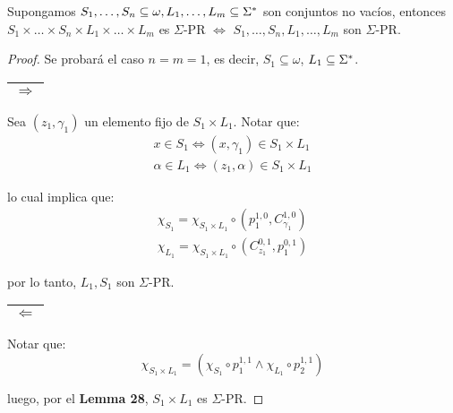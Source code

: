   \begin{lemma}
    \PN Supongamos $S_{1}, \dotsc, S_{n} \subseteq \omega, L_{1}, \dotsc, L_{m} \subseteq \Sigma^{\ast}$ son conjuntos no
    vacíos, entonces $S_{1} \times \dotsc \times S_{n} \times L_{1} \times \dotsc \times L_{m}$ es $\Sigma$-PR
    $\Leftrightarrow$ $S_{1}, \dotsc, S_{n}, L_{1}, \dotsc, L_{m}$ son $\Sigma$-PR.
  \end{lemma}
  \begin{proof}
    \PN Se probará el caso $n = m = 1$, es decir, $S_{1} \subseteq \omega$, $L_{1} \subseteq \Sigma^{\ast}$.

    \vspace{3mm}
    \PN \begin{tabular}{|c|} \hline $\Rightarrow$ \\\hline \end{tabular} Sea $(z_{1}, \gamma_{1})$ un elemento fijo de
    $S_{1} \times L_{1}$. Notar que:
    \begin{eqnarray*}
      x \in S_{1} \Leftrightarrow (x, \gamma_{1}) \in S_{1} \times L_{1} \\
      \alpha \in L_{1} \Leftrightarrow (z_{1}, \alpha) \in S_{1} \times L_{1}
    \end{eqnarray*}

    \PN lo cual implica que:
    \begin{eqnarray*}
      \chi_{S_{1}} = \chi_{S_{1} \times L_{1}} \circ \left(p_{1}^{1,0}, C_{\gamma_{1}}^{1,0}\right) \\
      \chi_{L_{1}} = \chi_{S_{1} \times L_{1}} \circ \left(C_{z_{1}}^{0,1}, p_{1}^{0,1}\right)
    \end{eqnarray*}

    \PN por lo tanto, $L_{1}, S_{1}$ son $\Sigma$-PR.

    \vspace{3mm}
    \PN \begin{tabular}{|c|} \hline $\Leftarrow$\\\hline \end{tabular} Notar que:
    \[
      \chi_{S_{1} \times L_{1}} = \left(\chi_{S_{1}} \circ p_{1}^{1,1} \wedge \chi_{L_{1}} \circ p_{2}^{1,1} \right)
    \]

    \PN luego, por el \textbf{Lemma 28}, $S_{1} \times L_{1}$ es $\Sigma$-PR.
  \end{proof}

